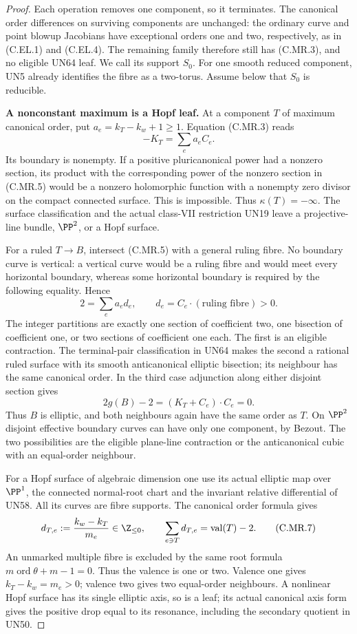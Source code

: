 \begin{proof}
Each operation removes one component, so it terminates.
The canonical order differences on surviving components
are unchanged: the ordinary curve and point blowup
Jacobians have exceptional orders one and two,
respectively, as in (C.EL.1) and (C.EL.4). The remaining
family therefore still has (C.MR.3), and no eligible
UN64 leaf. We call its support $S_0$.
For one smooth reduced component, UN5 already identifies
the fibre as a two-torus. Assume below that $S_0$ is
reducible.

\par\medskip\noindent\textbf{A nonconstant maximum is a Hopf leaf.}
At a component $T$ of maximum canonical order, put
$a_e=k_T-k_w+1\ge1$. Equation (C.MR.3) reads
\[
                         -K_T=\sum_e a_eC_e.
\tag{C.MR.5}
\]
Its boundary is nonempty. If a positive pluricanonical
power had a nonzero section, its product with the
corresponding power of the nonzero section in (C.MR.5)
would be a nonzero holomorphic function with a nonempty
zero divisor on the compact connected surface. This is
impossible. Thus $\kappa(T)=-\infty$. The surface
classification and the actual class-VII restriction UN19
leave a projective-line bundle, $\PP^2$, or a Hopf
surface.

For a ruled $T\to B$, intersect (C.MR.5) with a general
ruling fibre. No boundary curve is vertical: a vertical
curve would be a ruling fibre and would meet every
horizontal boundary, whereas some horizontal boundary
is required by the following equality. Hence
\[
              2=\sum_e a_ed_e,\qquad
              d_e=C_e\cdot(\text{ruling fibre})>0.
\tag{C.MR.6}
\]
The integer partitions are exactly one section of
coefficient two, one bisection of coefficient one,
or two sections of coefficient one each. The first
is an eligible contraction. The terminal-pair
classification in UN64 makes the second a rational
ruled surface with its smooth anticanonical elliptic
bisection; its neighbour has the same canonical order.
In the third case adjunction along either disjoint
section gives
\[
       2g(B)-2=(K_T+C_e)\cdot C_e=0.
\]
Thus $B$ is elliptic, and both neighbours again have
the same order as $T$. On $\PP^2$ disjoint effective
boundary curves can have only one component, by
Bezout. The two possibilities are the eligible
plane-line contraction or the anticanonical cubic
with an equal-order neighbour.

For a Hopf surface of algebraic dimension one use
its actual elliptic map over $\PP^1$, the connected
normal-root chart and the invariant relative
differential of UN58. All its curves are fibre
supports. The canonical order formula gives
\[
 d_{T,e}:=\frac{k_w-k_T}{m_e}\in\Z_{\le0},
 \qquad
              \sum_{e\ni T}d_{T,e}
                                  =\operatorname{val}(T)-2.
\tag{C.MR.7}
\]
An unmarked multiple fibre is excluded by the same
root formula $m\operatorname{ord}\theta+m-1=0$.
Thus the valence is one or two. Valence one gives
$k_T-k_w=m_e>0$; valence two gives two equal-order
neighbours. A nonlinear Hopf surface has its single
elliptic axis, so is a leaf; its actual canonical
axis form gives the positive drop equal to its
resonance, including the secondary quotient in UN50.


\end{proof}
